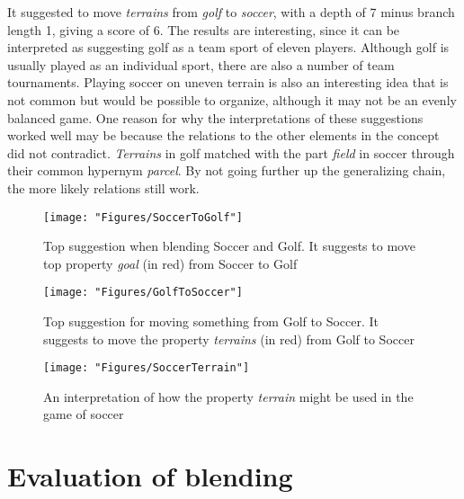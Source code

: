 It suggested to move \emph{terrains} from \emph{golf} to \emph{soccer}, with a depth of 7 minus branch length 1, giving a score of 6. The results are interesting, since it can be interpreted as suggesting golf as a team sport of eleven players. Although golf is usually played as an individual sport, there are also a number of team tournaments. Playing soccer on uneven terrain is also an interesting idea that is not common but would be possible to organize, although it may not be an evenly balanced game. One reason for why the interpretations of these suggestions worked well may be because the relations to the other elements in the concept did not contradict. \emph{Terrains} in golf matched with the part \emph{field} in soccer through their common hypernym \emph{parcel}. By not going further up the generalizing chain, the more likely relations still work.

\begin{figure} \centering \texttt{[image: "Figures/SoccerToGolf"]} \caption{Top suggestion when blending Soccer and Golf. It suggests to move top property \emph{goal} (in red) from Soccer to Golf } \label{ SoccerToGolf } \end{figure}

\begin{figure} \centering \texttt{[image: "Figures/GolfToSoccer"]} \caption{Top suggestion for moving something from Golf to Soccer. It suggests to move the property \emph{terrains} (in red) from Golf to Soccer } \label{ GolfToSoccer } \end{figure}

\begin{figure} \centering \texttt{[image: "Figures/SoccerTerrain"]} \caption{An interpretation of how the property \emph{terrain} might be used in the game of soccer} \label{ SoccerTerrain } \end{figure}


\section{Evaluation of blending}

